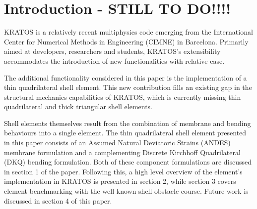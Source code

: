 


\chapter{Introduction - STILL TO DO!!!!}
\label{chap:chapter_1}

\renewcommand{\Thema}{Introduction}

KRATOS is a relatively recent multiphysics code emerging from the International Center for Numerical Methods in Engineering (CIMNE) in Barcelona. Primarily aimed at developers, researchers and students, KRATOS's extensibility accommodates the introduction of new functionalities with relative ease.

The additional functionality considered in this paper is the implementation of a thin quadrilateral shell element. This new contribution fills an existing gap in the structural mechanics capabilities of KRATOS, which is currently missing thin quadrilateral and thick triangular shell elements.

Shell elements themselves result from the combination of membrane and bending behaviours into a single element. The thin quadrilateral shell element presented in this paper consists of an Assumed Natural Deviatoric Strains (ANDES) membrane formulation and a complementing Discrete Kirchhoff Quadrilateral (DKQ) bending formulation. Both of these component formulations are discussed in section 1 of the paper. Following this, a high level overview of the element's implementation in KRATOS is presented in section 2, while section 3 covers element benchmarking with the well known shell obstacle course. Future work is discussed in section 4 of this paper.